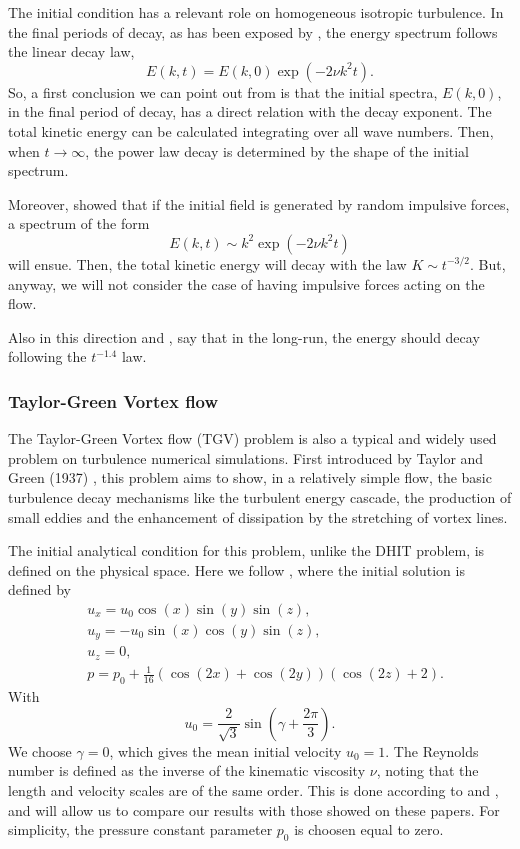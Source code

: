 The initial condition has a relevant role on homogeneous isotropic turbulence. In the final periods of decay, as has been exposed by \cite{hinze_turbulence_1975}, the energy spectrum follows the linear decay law,
\begin{equation}
\label{eq-DHIT_final_decay}
E(k,t)=E(k,0)\exp(-2\nu k^2t).
\end{equation}
So, a first conclusion we can point out from  is that the initial spectra, $E(k,0)$, in the final period of decay, has a direct relation with the decay exponent. The total kinetic energy can be calculated integrating  over all wave numbers. Then, when $t\rightarrow\infty$, the power law decay is determined by the shape of the initial spectrum.

Moreover, \cite{Staffman 1967} showed that if the initial field is generated by random impulsive forces, a spectrum of the form
\begin{equation}
\label{eq-DHIT_staffman_decay}
E(k,t)\sim k^2\exp(-2\nu k^2t)
\end{equation}
will ensue. Then, the total kinetic energy will decay with the law $K\sim t^{-3/2}$. But, anyway, we will not consider the case of having impulsive forces acting on the flow.

Also in this direction \cite{rohe_analysis_2010} and \cite{chalot_consistent_1998}, say that in the long-run, the energy should decay following the $t^{-1.4}$ law.

\subsubsection{Taylor-Green Vortex flow}
The Taylor-Green Vortex flow (TGV) problem is also a typical and widely used problem on turbulence numerical simulations. First introduced by Taylor and Green (1937) \cite{taylor}, this problem aims to show, in a relatively simple flow, the basic turbulence decay mechanisms like the turbulent energy cascade, the production of small eddies and the enhancement of dissipation by the stretching of vortex lines.

The initial analytical condition for this problem, unlike the DHIT problem, is defined on the physical space. Here we follow \cite{gassner_accuracy_????}, where the initial solution is defined by
\begin{align}
\label{eq-TGV_initial_condition}
&u_x=u_0\cos(x)\sin(y)\sin(z),\\\nonumber
&u_y=-u_0\sin(x)\cos(y)\sin(z),\\\nonumber
&u_z=0,\\\nonumber
&p=p_0+\frac{1}{16}\left(\cos(2x)+\cos(2y)\right)\left(\cos(2z)+2\right).
\end{align}
With
$$u_0=\frac{2}{\sqrt{3}}\sin\left(\gamma+\frac{2\pi}{3}\right).$$
We choose $\gamma=0$, which gives the mean initial velocity  $u_0=1$. The Reynolds number is defined as the inverse of the kinematic viscosity $\nu$, noting that the length and velocity scales are of the same order. This is done according to \cite{gassner_accuracy_????} and \cite{brachet_direct_1991}, and will allow us to compare our results with those showed on these papers. For simplicity, the pressure constant parameter $p_0$ is choosen equal to zero.

